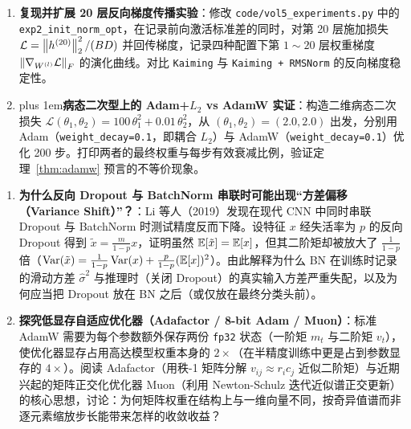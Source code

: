 \begin{enumerate}
  \item[\textbf{5.2.5}] \textbf{复现并扩展 20 层反向梯度传播实验}：修改 \texttt{code/vol5\_experiments.py} 中的 \texttt{exp2\_init\_norm\_opt}，在记录前向激活标准差的同时，对第 20 层施加损失 $\mathcal{L} = \left\|h^{(20)}\right\|_2^2 / (BD)$ 并回传梯度，记录四种配置下第 $1 \sim 20$ 层权重梯度 $\left\|\nabla_{W^{(l)}} \mathcal{L}\right\|_F$ 的演化曲线。对比 \texttt{Kaiming} 与 \texttt{Kaiming + RMSNorm} 的反向梯度稳定性。

  \item[\textbf{5.2.6}] {\rightskip=0pt plus 1em\relax \textbf{病态二次型上的 Adam+$L_2$ vs AdamW 实证}：构造二维病态二次损失 $\mathcal{L}(\theta_1, \theta_2) = 100\,\theta_1^2 + 0.01\,\theta_2^2$，从 $(\theta_1, \theta_2) = (2.0, 2.0)$ 出发，分别用 Adam（\texttt{weight\_decay=0.1}，即耦合 $L_2$）与 AdamW（\texttt{weight\_decay=0.1}）优化 200 步。打印两者的最终权重与每步有效衰减比例，验证定理~\ref{thm:adamw} 预言的不等价现象。\par}
\end{enumerate}


\begin{enumerate}
  \item[\textbf{5.2.7}] \textbf{为什么反向 Dropout 与 BatchNorm 串联时可能出现“方差偏移（Variance Shift）”？}：Li 等人（2019）发现在现代 CNN 中同时串联 Dropout 与 BatchNorm 时测试精度反而下降。设特征 $x$ 经失活率为 $p$ 的反向 Dropout 得到 $\tilde{x} = \frac{m}{1-p} x$，证明虽然 $\mathbb{E}[\tilde{x}] = \mathbb{E}[x]$，但其二阶矩却被放大了 $\frac{1}{1-p}$ 倍（$\operatorname{Var}(\tilde{x}) = \frac{1}{1-p}\operatorname{Var}(x) + \frac{p}{1-p}(\mathbb{E}[x])^2$）。由此解释为什么 BN 在训练时记录的滑动方差 $\hat{\sigma}^2$ 与推理时（关闭 Dropout）的真实输入方差严重失配，以及为何应当把 Dropout 放在 BN 之后（或仅放在最终分类头前）。

  \item[\textbf{5.2.8}] \textbf{探究低显存自适应优化器（Adafactor / 8-bit Adam / Muon）}：标准 AdamW 需要为每个参数额外保存两份 \texttt{fp32} 状态（一阶矩 $m_t$ 与二阶矩 $v_t$），使优化器显存占用高达模型权重本身的 $2\times$（在半精度训练中更是占到参数显存的 $4\times$）。阅读 Adafactor（用秩-1 矩阵分解 $v_{ij} \approx r_i c_j$ 近似二阶矩）与近期兴起的矩阵正交化优化器 Muon（利用 Newton-Schulz 迭代近似谱正交更新）的核心思想，讨论：为何矩阵权重在结构上与一维向量不同，按奇异值谱而非逐元素缩放步长能带来怎样的收敛收益？
\end{enumerate}
